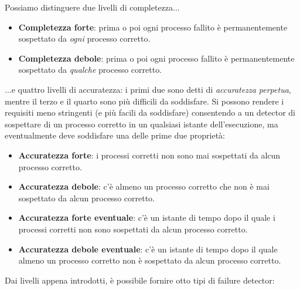 Possiamo distinguere due livelli di completezza...
\begin{itemize}
    \item \textbf{Completezza forte}: prima o poi ogni processo fallito è permanentemente sospettato da \textit{ogni} processo corretto.
    \item \textbf{Completezza debole}: prima o poi ogni processo fallito è permanentemente sospettato da \textit{qualche} processo corretto.
\end{itemize}
...e quattro livelli di accuratezza: i primi due sono detti di \textit{accuratezza perpetua}, mentre il terzo e il quarto sono più difficili da soddisfare. Si possono rendere i requisiti meno stringenti (e più facili da soddisfare) consentendo a un detector di sospettare di un processo corretto in un qualsiasi istante dell'esecuzione, ma eventualmente deve soddisfare una delle prime due proprietà:
\begin{itemize}
    \item \textbf{Accuratezza forte}: i processi corretti non sono mai sospettati da alcun processo corretto.
    \item \textbf{Accuratezza debole}: c'è almeno un processo corretto che non è mai sospettato da alcun processo corretto.
    \item \textbf{Accuratezza forte eventuale}: c'è un istante di tempo dopo il quale i processi corretti non sono sospettati da alcun processo corretto.
    \item \textbf{Accuratezza debole eventuale}: c'è un istante di tempo dopo il quale almeno un processo corretto non è sospettato da alcun processo corretto.
\end{itemize}
Dai livelli appena introdotti, è possibile fornire otto tipi di failure detector:

